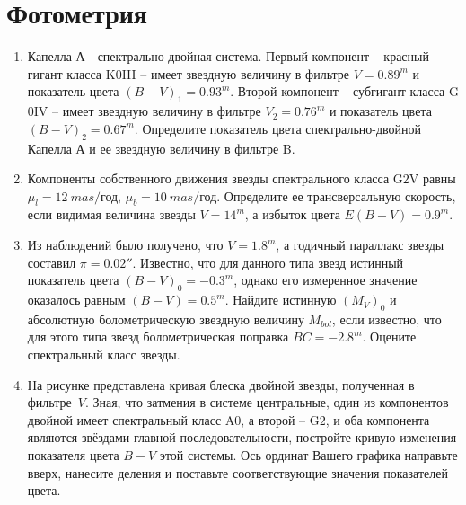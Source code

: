 \documentclass[12pt]{article}
\begin{document}
\section*{Фотометрия}
\begin{enumerate}[resume]
    \item Капелла А - спектрально-двойная система. Первый компонент -- красный гигант класса K$0$III -- имеет звездную величину в фильтре $V=0.89^m$ и показатель цвета $(B-V)_{1}=0.93^m$. Второй компонент -- субгигант класса G$0$IV -- имеет звездную величину в фильтре $V_2=0.76^m$ и показатель цвета $(B-V)_{2}=0.67^m$. Определите показатель цвета спектрально-двойной Капелла А и ее звездную величину в фильтре B.
    \item Компоненты собственного движения звезды спектрального класса G$2$V равны $\mu_l=12~mas/\mbox{год}$, $\mu_b=10~mas/\mbox{год}$. Определите ее трансверсальную скорость, если видимая величина звезды $V=14^m$, а избыток цвета $E(B-V)=0.9^m$.
    \item Из наблюдений было получено, что $V = 1.8^m$, а годичный параллакс звезды составил $\pi=0.02''$. Известно, что для данного типа звезд истинный показатель цвета $(B-V)_0=-0.3^m$, однако его измеренное значение оказалось равным $(B-V)=0.5^m$. Найдите истинную $(M_V)_0$ и абсолютную болометрическую звездную величину $M_{bol}$, если известно, что для этого типа звезд болометрическая поправка $BC=-2.8^m$. Оцените спектральный класс звезды.
    \item На рисунке представлена кривая блеска двойной звезды, полученная в фильтре~$V$. Зная, что затмения в системе центральные, один из компонентов двойной имеет спектральный класс A$0$, а второй -- G$2$, и оба компонента являются звёздами главной последовательности, постройте кривую изменения показателя цвета $B-V$ этой системы. Ось ординат Вашего графика направьте вверх, нанесите деления и поставьте соответствующие значения показателей цвета.

    \begin{figure}[ht]
    \end{figure}
\end{enumerate}
\end{document}
